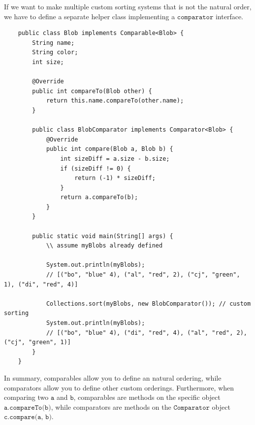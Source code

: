 \documentclass{article}
\begin{document}
    If we want to make multiple custom sorting systems that is not the natural order, we have to define a separate helper class implementing a $\texttt{comparator}$ interface. 
    \begin{lstlisting}
    public class Blob implements Comparable<Blob> {
        String name; 
        String color; 
        int size; 
        
        @Override 
        public int compareTo(Blob other) {
            return this.name.compareTo(other.name); 
        }
        
        public class BlobComparator implements Comparator<Blob> {
            @Override 
            public int compare(Blob a, Blob b) {
                int sizeDiff = a.size - b.size; 
                if (sizeDiff != 0) {
                    return (-1) * sizeDiff; 
                }
                return a.compareTo(b); 
            }
        }
        
        public static void main(String[] args) {
            \\ assume myBlobs already defined 
            
            System.out.println(myBlobs); 
            // [("bo", "blue" 4), ("al", "red", 2), ("cj", "green", 1), ("di", "red", 4)]
            
            Collections.sort(myBlobs, new BlobComparator()); // custom sorting  
            System.out.println(myBlobs); 
            // [("bo", "blue" 4), ("di", "red", 4), ("al", "red", 2), ("cj", "green", 1)]
        }
    }
    \end{lstlisting}

    In summary, comparables allow you to define an natural ordering, while comparators allow you to define other custom orderings. Furthermore, when comparing two $\texttt{a}$ and $\texttt{b}$, comparables are methods on the specific object $\texttt{a.compareTo(b)}$, while comparators are methods on the $\texttt{Comparator}$ object $\texttt{c.compare(a, b)}$. 
\end{document}
